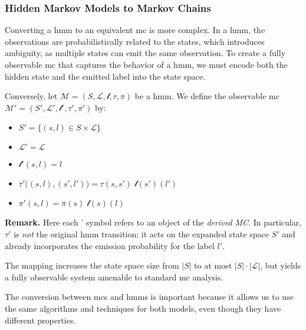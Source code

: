 \subsubsection{Hidden Markov Models to Markov Chains}\label{subsec:hmm2mc}
Converting a \gls{hmm} to an equivalent \gls{mc} is more complex.
In a \gls{hmm}, the observations are probabilistically related to the states, which introduces ambiguity, as multiple states can emit the same observation.
To create a fully observable \gls{mc} that captures the behavior of a \gls{hmm}, we must encode both the hidden state and the emitted label into the state space.
\begin{definition}
    Conversely, let
    \(
    \mathcal{M}
    = (S, \mathcal{L}, \mathscr{l}, \tau, \pi)
    \)
    be a \gls{hmm}.
    We define the observable \gls{mc}
    \(
    \mathcal{M}'
    = (S', \mathcal{L}', \mathscr{l}', \tau', \pi')
    \)
    by:
    \begin{itemize}
        \item $S' = \{(s,l)\in S\times\mathcal{L}\}$%
        \item $\mathcal{L}' = \mathcal{L}$%
        \item $\mathscr{l}'(s,l) = l$%
        \item $\tau'\big((s,l),(s',l')\big) = \tau(s,s')\;\mathscr{l}(s')(l')$%
        \item $\pi'(s,l) = \pi(s)\;\mathscr{l}(s)(l)$%
    \end{itemize}
    \textbf{Remark.}
    Here each ' symbol refers to an object of the \emph{derived MC}.  In
    particular, $\tau'$ is \emph{not} the original \gls{hmm} transition; it acts on the
    expanded state space $S'$ and already incorporates the emission probability for
    the label $l'$.

    The mapping increases the state space size from $|S|$ to at most
    $|S|\cdot|\mathcal{L}|$, but yields a fully observable system amenable to
    standard \gls{mc} analysis.
\end{definition}

The conversion between \glspl{mc} and \glspl{hmm} is important because it allows us to use the same algorithms and techniques for both models, even though they have different properties.

